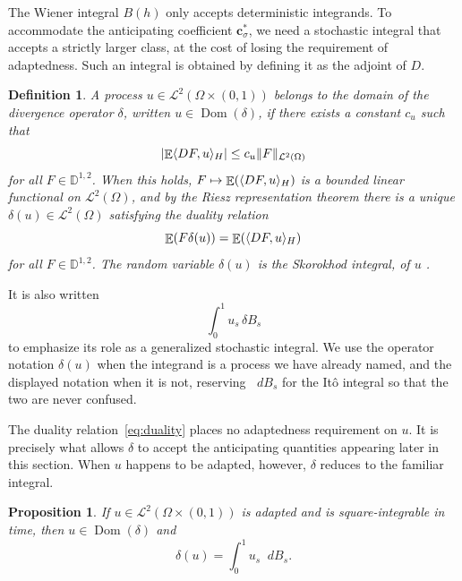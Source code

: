 \documentclass[11pt, a4paper]{article}
\theoremstyle{theoremstyle}
\newtheorem{proposition}[theorem]{Proposition}
\theoremstyle{definitionstyle}
\newtheorem{definition}[theorem]{Definition}
\newcommand{\dd}{\mathop{}\!d}
\DeclareMathOperator{\EE}{\mathbb E}
\DeclareMathOperator{\Dom}{\operatorname{Dom}}
\DeclarePairedDelimiter{\norm}{\lVert}{\rVert}
\DeclarePairedDelimiter{\abs}{\lvert}{\rvert}
\DeclarePairedDelimiter{\ip}{\langle}{\rangle}
\begin{document}
The Wiener integral $B(h)$ only accepts deterministic integrands. To accommodate the anticipating coefficient $\mathbf c_\sigma^*$, we need a stochastic integral that accepts a strictly larger class, at the cost of losing the requirement of adaptedness. Such an integral is obtained by defining it as the adjoint of $D$.
\begin{definition}\label{def:skorokhod}
    A process $u \in \mathcal L^2(\Omega \times(0,1))$ belongs to the domain of the \emph{divergence operator} $\delta$, written $u \in \Dom (\delta)$, if there exists a constant $c_u$ such that
    \begin{equation}
        \abs{\EE\ip{DF,u}_H}\le c_u\norm{F}_{\mathcal L^2(\Omega)}
    \end{equation}
    for all $F \in \mathbb D^{1,2}$. When this holds, $F \mapsto \EE (\ip{DF,u}_H)$ is a bounded linear functional on $\mathcal L^2(\Omega)$, and by the Riesz representation theorem \cite{rudin1991functional} there is a unique $\delta(u)\in \mathcal L^2(\Omega)$ satisfying the duality relation
    \begin{equation}\label{eq:duality}
        \EE(F \delta(u))=\EE(\ip{DF,u}_H)
    \end{equation}
    for all $F \in \mathbb D^{1,2}$. The random variable $\delta(u)$ is the \emph{Skorokhod integral}, of $u$ \cite{skorokhod1975,nualart2006malliavin}.
\end{definition}
 
It is also written
\begin{equation}
    \int_0^1u_s\,\delta B_s
\end{equation}
to emphasize its role as a generalized stochastic integral. We use the operator notation $\delta(u)$ when the integrand is a process we have already named, and the displayed notation when it is not, reserving $\dd{B_s}$ for the It\^o integral so that the two are never confused.

The duality relation~\eqref{eq:duality} places no adaptedness requirement on $u$. It is precisely what allows $\delta$ to accept the anticipating quantities appearing later in this section. When $u$ happens to be adapted, however, $\delta$ reduces to the familiar integral.
\begin{proposition}\label{prop:ito_special_case}
    If $u \in \mathcal L^2(\Omega \times(0,1))$ is adapted and is square-integrable in time, then $u \in \Dom (\delta)$ and
    \begin{equation}
        \delta(u)=\int_0^1u_s\dd{B_s}.
    \end{equation}
\end{proposition}
\end{document}
